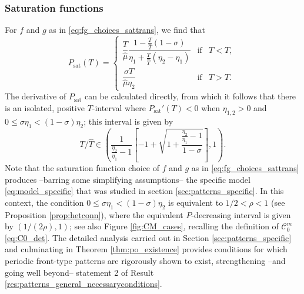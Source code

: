 \documentclass[a4paper,10pt,abstract=true,parskip=true]{scrartcl}
\theoremstyle{remark}
\numberwithin{equation}{section}
\numberwithin{thm}{section}
\begin{document}
 \subsubsection{Saturation functions} For $f$ and $g$ as in \eqref{eq:fg_choices_sattrans}, we find that 
 \begin{equation}
  P_\text{sat}(T) = \left\{\begin{array}{rcl} \dfrac{T}{\hat{\mu}}\dfrac{1-\frac{T}{\hat{T}}(1-\sigma)}{\eta_1 + \frac{T}{\hat{T}}(\eta_2-\eta_1)} & \text{if} & T < \hat{T},\\ \dfrac{ \sigma T}{\hat{\mu}\eta_2} & \text{if} & T > \hat{T} .   
  \end{array}\right.    \,
 \end{equation}
 The derivative of $P_\text{sat}$ can be calculated directly, from which it follows that there is an isolated, positive $T$-interval where $P_\text{sat}'(T) <0$ when $\eta_{1,2}>0$ and $0 \leq \sigma \eta_1 < (1-\sigma)\eta_2$; this interval is given by
\begin{displaymath}
    T/\hat{T} \in \left(\frac{1}{\frac{\eta_2}{\eta_1}-1} \left[-1+\sqrt{1+\frac{\frac{\eta_2}{\eta_1}-1}{1-\sigma}}\right],1\right).
\end{displaymath}
Note that the saturation function choice of $f$ and $g$ as in \eqref{eq:fg_choices_sattrans} produces --barring some simplifying assumptions-- the specific model \eqref{eq:model_specific} that was studied in section \ref{sec:patterns_specific}. In this context, the condition $0 \leq \sigma \eta_1 < (1-\sigma)\eta_2$ is equivalent to $1/2 < \rho < 1$ (see Proposition \ref{prop:hetconn}), where the equivalent $P$-decreasing interval is given by $\left(1/(2\rho),1\right)$; see also Figure \ref{fig:CM_cases}, recalling the definition of $\mathcal{C}_0^m$ \eqref{eq:C0_det}. The detailed analysis carried out in Section \ref{sec:patterns_specific} and culminating in Theorem \ref{thm:po_existence} provides conditions for which periodic front-type patterns are rigorously shown to exist, strengthening --and going well beyond-- statement 2 of Result \ref{res:patterns_general_necessaryconditions}.
\end{document}
